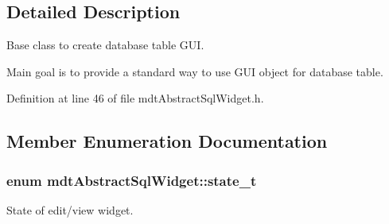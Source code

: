 \subsection{Detailed Description}
Base class to create database table GUI. 

Main goal is to provide a standard way to use GUI object for database table. 

Definition at line 46 of file mdtAbstractSqlWidget.h.



\subsection{Member Enumeration Documentation}
\hypertarget{classmdt_abstract_sql_widget_a54e6a7f2b41fb3edfa1e4ed62abf4072}{
\subsubsection[{state\_\-t}]{\setlength{\rightskip}{0pt plus 5cm}enum {\bf mdtAbstractSqlWidget::state\_\-t}}}
\label{classmdt_abstract_sql_widget_a54e6a7f2b41fb3edfa1e4ed62abf4072}


State of edit/view widget. 

